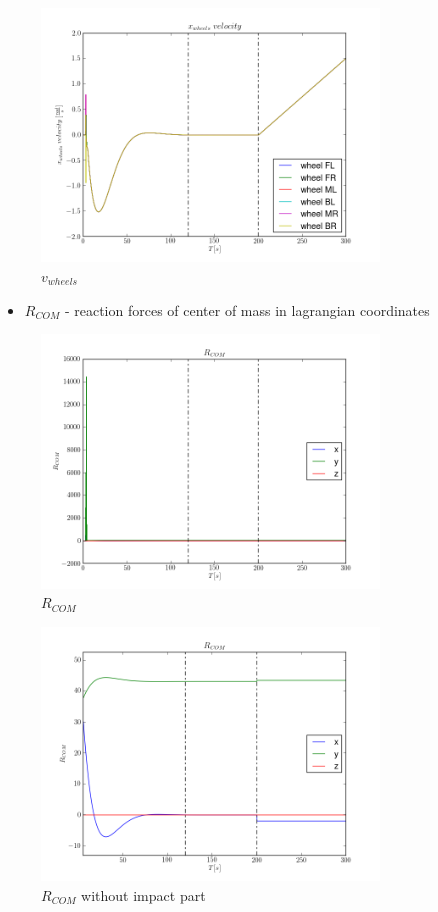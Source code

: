 \begin{figure}[H]
  \centering
    \includegraphics[width=0.8\textwidth]{vWHEELS5}
  \caption{$v_{wheels}$}
\end{figure}

\begin{itemize}
  \item $R_{COM}$ - reaction forces of center of mass in lagrangian coordinates
\end{itemize}

\begin{figure}[H]
  \centering
    \includegraphics[width=0.8\textwidth]{pCOM5}
  \caption{$R_{COM}$}
\end{figure}

\begin{figure}[H]
  \centering
    \includegraphics[width=0.8\textwidth]{pCOM5postimpact}
  \caption{$R_{COM}$ without impact part}
\end{figure}

